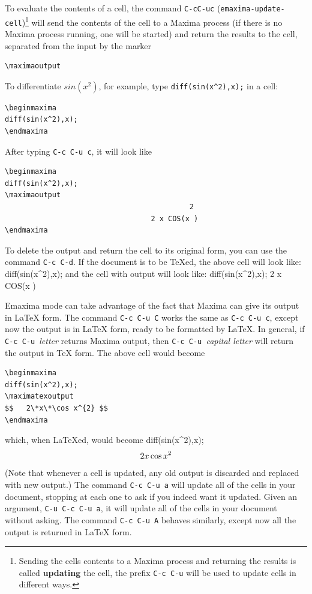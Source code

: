 \noindent
To evaluate the contents of a cell, the command
\texttt{C-cC-uc} (\texttt{emaxima-update-cell})\footnote{Sending the
  cells contents to a Maxima process and returning the results is
  called \textbf{updating} the cell, the prefix 
\texttt{C-c C-u} will be used to update cells in different ways.} 
will send the contents
of the cell to a Maxima process (if there is no Maxima process running,
one will be started) and return the results to the cell,
separated from the input by the marker
\begin{verbatim}
\maximaoutput
\end{verbatim}
\noindent
To differentiate
$sin(x^2)$, for example, type 
\texttt{diff(sin(x\^{}2),x);} in a cell:
\begin{verbatim}
\beginmaxima
diff(sin(x^2),x);
\endmaxima
\end{verbatim}
\noindent
After typing \texttt{C-c C-u c}, it will look like
\begin{verbatim}
\beginmaxima
diff(sin(x^2),x);
\maximaoutput
                                           2
                                  2 x COS(x )
\endmaxima
\end{verbatim}
\noindent
To delete the output and return the cell to its original form, you can
use the command \texttt{C-c C-d}.
If the document is to be \TeX{}ed, the above cell will look like:
\beginmaxima
diff(sin(x^2),x);
\endmaxima
and the cell with output will look like:
\beginmaxima
diff(sin(x^2),x);
                                  2 x COS(x )
\endmaxima

Emaxima mode can take advantage of the fact that Maxima can give its
output in \LaTeX{} form.  The command \texttt{C-c C-u C}
works the same as \texttt{C-c C-u c}, except now the output is in \LaTeX{}
form, ready to be formatted by \LaTeX{}.  In general, if 
\texttt{C-c C-u }\textsl{letter} returns Maxima output, then
\texttt{C-c C-u }\textsl{capital letter} will return the output in
\TeX{} form.  The above cell would become
\begin{verbatim}
\beginmaxima
diff(sin(x^2),x);
\maximatexoutput
$$   2\*x\*\cos x^{2} $$
\endmaxima
\end{verbatim}
\noindent
which, when \LaTeX{}ed, would become
\beginmaxima
diff(sin(x^2),x);
\maximatexoutput
$$   2\*x\*\cos x^{2} $$
\endmaxima
\noindent
(Note that whenever a cell is updated, any old output is discarded and
replaced with new output.)  The command \texttt{C-c C-u a} will update all
of the cells in your document, 
stopping at each one to ask if you indeed want it updated.  Given an
argument, \texttt{C-u C-c C-u a}, it will update all of the cells in your
document without asking.  The command \texttt{C-c C-u A} behaves
similarly, except now all the output is returned in \LaTeX{}  form.

